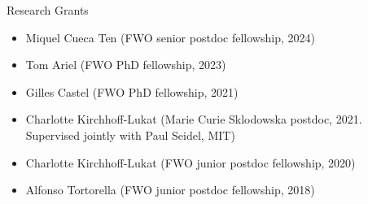 \documentclass[12p]{resume}
\begin{document}
\begin{category}{Research Grants}
\begin{itemize}

\end{itemize}



\begin{itemize}


\item Miquel Cueca Ten  (FWO senior postdoc fellowship, 2024)
\item Tom Ariel (FWO PhD fellowship, 2023)
\item Gilles Castel (FWO PhD fellowship, 2021)
\item  Charlotte Kirchhoff-Lukat (Marie Curie Sklodowska postdoc, 2021. Supervised jointly with Paul Seidel, MIT)
\item Charlotte Kirchhoff-Lukat (FWO junior postdoc fellowship, 2020)
\item  Alfonso Tortorella (FWO junior postdoc fellowship, 2018)
\end{itemize}








\end{category}
\end{document}
